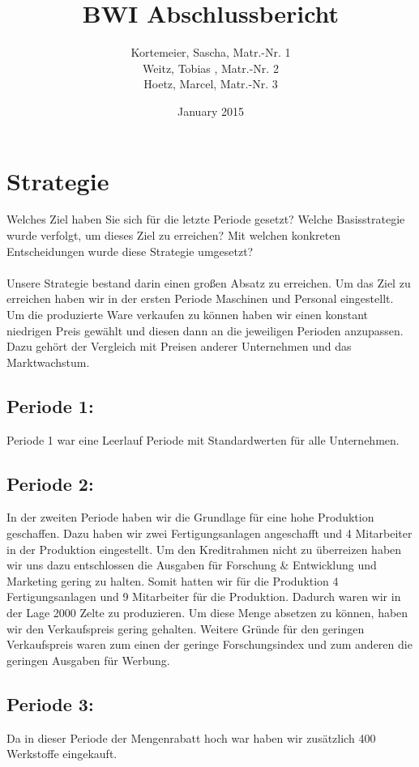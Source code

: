 \documentclass[12pt]{article}
\title{BWI Abschlussbericht}
\author{Kortemeier, Sascha, Matr.-Nr. 1 \\
Weitz, Tobias , Matr.-Nr. 2 \\
Hoetz, Marcel, Matr.-Nr. 3}
\date{January 2015}
\begin{document}
\maketitle

\section{Strategie}

Welches Ziel haben Sie sich für die letzte Periode gesetzt? 
Welche Basisstrategie wurde verfolgt, um dieses Ziel zu erreichen?
Mit welchen konkreten Entscheidungen wurde diese Strategie umgesetzt?
\\
\\
Unsere Strategie bestand darin einen großen Absatz zu erreichen. 
Um das Ziel zu erreichen haben wir in der ersten Periode Maschinen und Personal eingestellt. 
Um die produzierte Ware verkaufen zu können haben wir einen konstant niedrigen Preis gewählt und diesen dann an die jeweiligen Perioden anzupassen. 
Dazu gehört der Vergleich mit Preisen anderer Unternehmen und das Marktwachstum. 

\subsection{Periode 1:}
Periode 1 war eine Leerlauf Periode mit Standardwerten für alle Unternehmen.	

\subsection{Periode 2:}
In der zweiten Periode haben wir die Grundlage für eine hohe Produktion geschaffen.
Dazu haben wir zwei Fertigungsanlagen angeschafft und 4 Mitarbeiter in der Produktion eingestellt.
Um den Kreditrahmen nicht zu überreizen haben wir uns dazu entschlossen die Ausgaben für Forschung \& Entwicklung und Marketing gering zu halten.
Somit hatten wir für die Produktion 4 Fertigungsanlagen und 9 Mitarbeiter für die Produktion.
Dadurch waren wir in der Lage 2000 Zelte zu produzieren.
Um diese Menge absetzen zu können, haben wir den Verkaufspreis gering gehalten.
Weitere Gründe für den geringen Verkaufspreis waren zum einen der geringe Forschungsindex und zum anderen die geringen Ausgaben für Werbung.

\subsection{Periode 3:}
Da in dieser Periode der Mengenrabatt hoch war haben wir zusätzlich 400 Werkstoffe eingekauft. 
\end{document}
